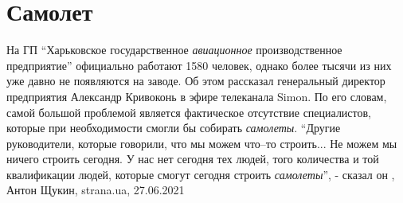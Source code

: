  
 
 
 
 
\chapter{Самолет}

На ГП \enquote{Харьковское государственное \emph{авиационное} производственное
предприятие} официально работают 1580 человек, однако более тысячи из них уже
давно не появляются на заводе.  Об этом рассказал генеральный директор
предприятия Александр Кривоконь в эфире телеканала Simon.  По его словам, самой
большой проблемой является фактическое отсутствие специалистов, которые при
необходимости смогли бы собирать \emph{самолеты}.  \enquote{Другие
руководители, которые говорили, что мы можем что–то строить... Не можем мы
ничего строить сегодня. У нас нет сегодня тех людей, того количества и той
квалификации людей, которые смогут сегодня строить \emph{самолеты}}, - сказал
он
, Антон Щукин, strana.ua, 27.06.2021

